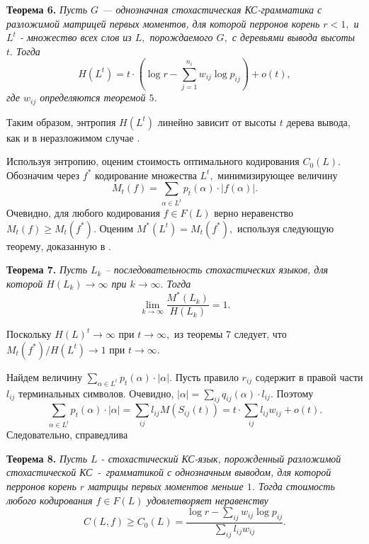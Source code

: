 \documentclass[%
11pt,a4paper]{article}
\begin{document}
{{{\medskip

\textbf {Теорема 6.}
{\em Пусть $G$ --- однозначная стохастическая КС-грамматика с разложимой
матрицей первых моментов, для которой перронов корень $r<1,$ и
$L^t$ - множество всех слов из $L,$ порождаемого $G,$ с деревьями вывода высоты $t.$ Тогда
$$
H(L^t) =t \cdot \left( \log r - \sum_{j=1}^{n_i} w_{ij}\log p_{ij}\right)+o(t),
$$
где $w_{ij}$ определяются теоремой $5$.
}

\medskip

Таким образом, энтропия $H(L^t)$ линейно зависит от высоты $t$ дерева вывода, как и в неразложимом случае \cite{zhil2}.

Используя энтропию, оценим стоимость оптимального кодирования $C_0(L).$
Обозначим через $f^*$ кодирование множества $L^t,$ минимизирующее величину
$$
M_t(f)=\sum_{\alpha \in L^t} p_t(\alpha)\cdot \left|f(\alpha)\right|.
$$
Очевидно, для любого кодирования $f \in F(L)$ верно неравенство $M_t(f) \ge M_t(f^*).$ Оценим  $M^*(L^t)=M_t(f^*),$ используя следующую теорему, доказанную в \cite{bor}.

\medskip

\textbf {Теорема 7.}
{\em Пусть $L_k$ -- последовательность стохастических языков, для которой $H(L_k) \rightarrow \infty$ при $k \rightarrow \infty.$ Тогда
$$
\lim_{k \rightarrow \infty} \frac{M^*(L_k)}{H(L_k)}=1.
$$
}
\medskip

Поскольку  $H(L)^t \rightarrow \infty$ при $t \rightarrow \infty,$ из теоремы 7 следует, что $M_t(f^*)/H(L^t) \rightarrow 1$ при $t \rightarrow \infty.$

Найдем величину $\sum_{ \alpha \in L^t} p_t(\alpha) \cdot | \alpha|.$ Пусть правило $r_{ij}$ содержит в правой части $l_{ij}$ терминальных символов. Очевидно, $\left|\alpha\right|=\sum_{ij} q_{ij}(\alpha)\cdot l_{ij}.$ Поэтому
$$
\sum_{ \alpha \in L^t} p_t(\alpha) \cdot | \alpha|=\sum_{ij} l_{ij} M(S_{ij}(t))= t\cdot \sum_{ij} l_{ij} w_{ij} +o(t).
$$
Следовательно, справедлива

\medskip

{\bf Теорема 8.}
{\em
Пусть $L$ - стохастический КС-язык, порожденный разложимой стохастической КС~-~грамматикой с однозначным выводом, для которой перронов корень $r$ матрицы первых моментов меньше $1$. Тогда стоимость любого кодирования $f \in F(L)$ удовлетворяет неравенству
$$
C(L,f) \ge C_0(L)= \frac {\log r-\sum_{ij} w_{ij}\log p_{ij}}{\sum_{ij} l_{ij} w_{ij}}.
$$
}

\medskip
}

\begin{thebibliography}{8}


\end{thebibliography}}}
\end{document}

